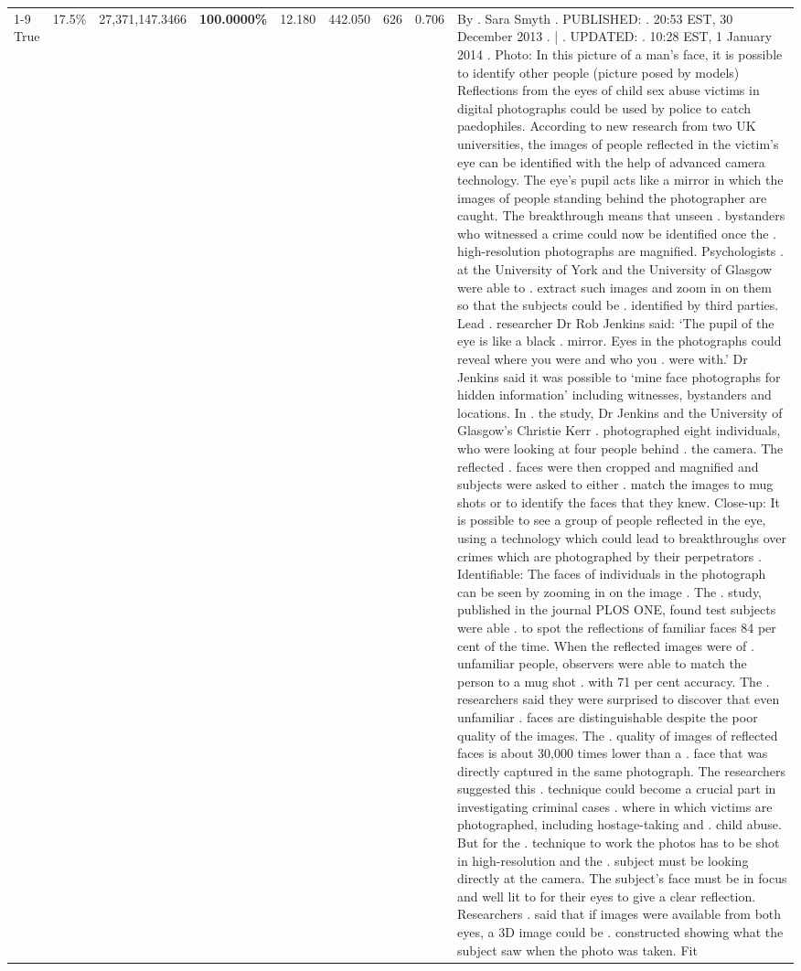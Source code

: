 \begin{table}[H]
\begin{tabular}{lllrlllll}
\cline{1-9}
True & 17.5\% & 27,371,147.3466 & \bfseries \color{red} 100.0000\% & 12.180 & 442.050 & 626 & 0.706 & By . Sara Smyth . PUBLISHED: . 20:53 EST, 30 December 2013 . | . UPDATED: . 10:28 EST, 1 January 2014 . Photo: In this picture of a man's face, it is possible to identify other people (picture posed by models) Reflections from the eyes of child sex abuse victims in digital photographs could be used by police to catch paedophiles. According to new research from two UK universities, the images of people reflected in the victim's eye can be identified with the help of advanced camera technology. The eye's pupil acts like a mirror in which the images of people standing behind the photographer are caught. The breakthrough means that unseen . bystanders who witnessed a crime could now be identified once the . high-resolution photographs are magnified. Psychologists . at the University of York and the University of Glasgow were able to . extract such images and zoom in on them so that the subjects could be . identified by third parties. Lead . researcher Dr Rob Jenkins said: ‘The pupil of the eye is like a black . mirror. Eyes in the photographs could reveal where you were and who you . were with.' Dr Jenkins said it was possible to ‘mine face photographs for hidden information' including witnesses, bystanders and locations. In . the study, Dr Jenkins and the University of Glasgow's Christie Kerr . photographed eight individuals, who were looking at four people behind . the camera. The reflected . faces were then cropped and magnified and subjects were asked to either . match the images to mug shots or to identify the faces that they knew. Close-up: It is possible to see a group of people reflected in the eye, using a technology which could lead to breakthroughs over crimes which are photographed by their perpetrators . Identifiable: The faces of individuals in the photograph can be seen by zooming in on the image . The . study, published in the journal PLOS ONE, found test subjects were able . to spot the reflections of familiar faces 84 per cent of the time. When the reflected images were of . unfamiliar people, observers were able to match the person to a mug shot . with 71 per cent accuracy. The . researchers said they were surprised to discover that even unfamiliar . faces are distinguishable despite the poor quality of the images. The . quality of images of reflected faces is about 30,000 times lower than a . face that was directly captured in the same photograph. The researchers suggested this . technique could become a crucial part in investigating criminal cases . where in which victims are photographed, including hostage-taking and . child abuse. But for the . technique to work the photos has to be shot in high-resolution and the . subject must be looking directly at the camera. The subject's face must be in focus and well lit to for their eyes to give a clear reflection. Researchers . said that if images were available from both eyes, a 3D image could be . constructed showing what the subject saw when the photo was taken. Fit \\

\end{tabular}
\end{table}
